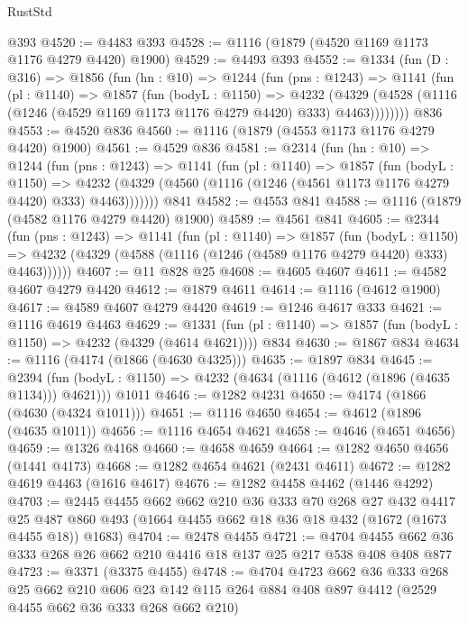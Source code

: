 \begin{lexlean}{RustStd}
\begin{coremodule}
{\begin{coremodule}
{{{{{{{{{{{    @393
@4520 := @4483 @393
@4528 := @1116 (@1879 (@4520 @1169 @1173 @1176 @4279 @4420) @1900)
@4529 := @4493 @393
@4552 := @1334
    (fun (D : @316) =>
    @1856
      (fun (hn : @10) =>
      @1244
        (fun (pns : @1243) =>
        @1141
          (fun (pl : @1140) =>
          @1857
            (fun (bodyL : @1150) =>
            @4232
              (@4329 (@4528 (@1116 (@1246 (@4529 @1169 @1173 @1176 @4279 @4420) @333) @4463))))))))
    @836
@4553 := @4520 @836
@4560 := @1116 (@1879 (@4553 @1173 @1176 @4279 @4420) @1900)
@4561 := @4529 @836
@4581 := @2314
    (fun (hn : @10) =>
    @1244
      (fun (pns : @1243) =>
      @1141
        (fun (pl : @1140) =>
        @1857
          (fun (bodyL : @1150) =>
          @4232 (@4329 (@4560 (@1116 (@1246 (@4561 @1173 @1176 @4279 @4420) @333) @4463)))))))
    @841
@4582 := @4553 @841
@4588 := @1116 (@1879 (@4582 @1176 @4279 @4420) @1900)
@4589 := @4561 @841
@4605 := @2344
    (fun (pns : @1243) =>
    @1141
      (fun (pl : @1140) =>
      @1857
        (fun (bodyL : @1150) =>
        @4232 (@4329 (@4588 (@1116 (@1246 (@4589 @1176 @4279 @4420) @333) @4463))))))
@4607 := @11 @828 @25
@4608 := @4605 @4607
@4611 := @4582 @4607 @4279 @4420
@4612 := @1879 @4611
@4614 := @1116 (@4612 @1900)
@4617 := @4589 @4607 @4279 @4420
@4619 := @1246 @4617 @333
@4621 := @1116 @4619 @4463
@4629 := @1331 (fun (pl : @1140) => @1857 (fun (bodyL : @1150) => @4232 (@4329 (@4614 @4621)))) @834
@4630 := @1867 @834
@4634 := @1116 (@4174 (@1866 (@4630 @4325)))
@4635 := @1897 @834
@4645 := @2394
    (fun (bodyL : @1150) => @4232 (@4634 (@1116 (@4612 (@1896 (@4635 @1134))) @4621)))
    @1011
@4646 := @1282 @4231
@4650 := @4174 (@1866 (@4630 (@4324 @1011)))
@4651 := @1116 @4650
@4654 := @4612 (@1896 (@4635 @1011))
@4656 := @1116 @4654 @4621
@4658 := @4646 (@4651 @4656)
@4659 := @1326 @4168
@4660 := @4658 @4659
@4664 := @1282 @4650 @4656 (@1441 @4173)
@4668 := @1282 @4654 @4621 (@2431 @4611)
@4672 := @1282 @4619 @4463 (@1616 @4617)
@4676 := @1282 @4458 @4462 (@1446 @4292)
@4703 := @2445
    @4455
    @662
    @662
    @210
    @36
    @333
    @70
    @268
    @27
    @432
    @4417
    @25
    @487
    @860
    @493
    (@1664 @4455 @662 @18 @36 @18 @432 (@1672 (@1673 @4455 @18)) @1683)
@4704 := @2478 @4455
@4721 := @4704 @4455 @662 @36 @333 @268 @26 @662 @210 @4416 @18 @137 @25 @217 @538 @408 @408 @877
@4723 := @3371 (@3375 @4455)
@4748 := @4704
    @4723
    @662
    @36
    @333
    @268
    @25
    @662
    @210
    @606
    @23
    @142
    @115
    @264
    @884
    @408
    @897
    @4412
    (@2529 @4455 @662 @36 @333 @268 @662 @210)
}}}}}}}}}}}
\end{coremodule}}
\end{coremodule}
\end{lexlean}
